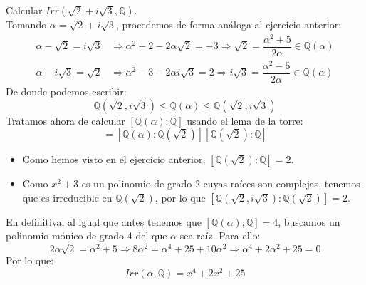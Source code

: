 \begin{ejercicio}
    Calcular $Irr(\sqrt{2}+i\sqrt{3},\mathbb{Q})$.\\

    \noindent
    Tomando $\alpha = \sqrt{2}+i\sqrt{3}$, procedemos de forma análoga al ejercicio anterior:
    \begin{align*}
        \alpha-\sqrt{2} = i\sqrt{3} &\Longrightarrow \alpha^2 + 2 - 2\alpha\sqrt{2} = -3 \Longrightarrow \sqrt{2} = \dfrac{\alpha^2+5}{2\alpha} \in \mathbb{Q}(\alpha)\\
        \alpha-i\sqrt{3} = \sqrt{2} &\Longrightarrow \alpha^2 -3 -2\alpha i \sqrt{3} = 2 \Longrightarrow i\sqrt{3} = \dfrac{\alpha^2-5}{2\alpha} \in \mathbb{Q}(\alpha)
    \end{align*}
    De donde podemos escribir:
    \begin{equation*}
        \mathbb{Q}(\sqrt{2},i\sqrt{3}) \leq \mathbb{Q}(\alpha) \leq \mathbb{Q}(\sqrt{2},i\sqrt{3})
    \end{equation*}
    Tratamos ahora de calcular $[\mathbb{Q}(\alpha):\mathbb{Q}]$ usando el lema de la torre:
    \begin{equation*}
        [\mathbb{Q}(\alpha):\mathbb{Q}] = [\mathbb{Q}(\alpha):\mathbb{Q}(\sqrt{2})][\mathbb{Q}(\sqrt{2}):\mathbb{Q}]
    \end{equation*}
    \begin{itemize}
        \item Como hemos visto en el ejercicio anterior, $[\mathbb{Q}(\sqrt{2}):\mathbb{Q}]=2$.
        \item Como $x^2+3$ es un polinomio de grado 2 cuyas raíces son complejas, tenemos que es irreducible en $\mathbb{Q}(\sqrt{2})$, por lo que $[\mathbb{Q}(\sqrt{2},i\sqrt{3}):\mathbb{Q}(\sqrt{2})] = 2$.
    \end{itemize}
    En definitiva, al igual que antes tenemos que $[\mathbb{Q}(\alpha),\mathbb{Q}] = 4$, buscamos un polinomio mónico de grado 4 del que $\alpha$ sea raíz. Para ello:
    \begin{equation*}
        2\alpha\sqrt{2} = \alpha^2 + 5 \Longrightarrow 8\alpha^2 = \alpha^4 + 25 + 10\alpha^2 \Longrightarrow \alpha^4 + 2\alpha^2 + 25 = 0
    \end{equation*}
    Por lo que:
    \begin{equation*}
        Irr(\alpha,\mathbb{Q}) = x^4+2x^2+25
    \end{equation*}
\end{ejercicio}

